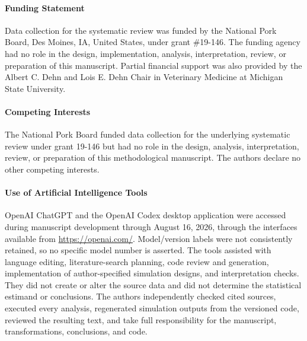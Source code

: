 \documentclass[journal=rsm]{CUP-JNL-DTM}%
\theoremstyle{definition}
\numberwithin{equation}{section}
\begin{document}
\begin{Backmatter}

\paragraph{Funding Statement}
Data collection for the systematic review was funded by the National Pork Board, Des Moines, IA, United States, under grant \#19-146. The funding agency had no role in the design, implementation, analysis, interpretation, review, or preparation of this manuscript. Partial financial support was also provided by the Albert C. Dehn and Lois E. Dehn Chair in Veterinary Medicine at Michigan State University.

\paragraph{Competing Interests}
The National Pork Board funded data collection for the underlying systematic
review under grant 19-146 but had no role in the design, analysis,
interpretation, review, or preparation of this methodological manuscript. The
authors declare no other competing interests.

\paragraph{Use of Artificial Intelligence Tools}
OpenAI ChatGPT and the OpenAI Codex desktop application were accessed during
manuscript development through August 16, 2026, through the interfaces
available from \url{https://openai.com/}. Model/version labels were not
consistently retained, so no specific model number is asserted. The tools
assisted with language editing, literature-search planning, code review and
generation, implementation of author-specified simulation designs, and
interpretation checks. They did not create or alter the source data and did not
determine the statistical estimand or conclusions. The authors independently
checked cited sources, executed every analysis, regenerated simulation outputs
from the versioned code, reviewed the resulting text, and take full
responsibility for the manuscript, transformations, conclusions, and code.


\end{Backmatter}
\end{document}

